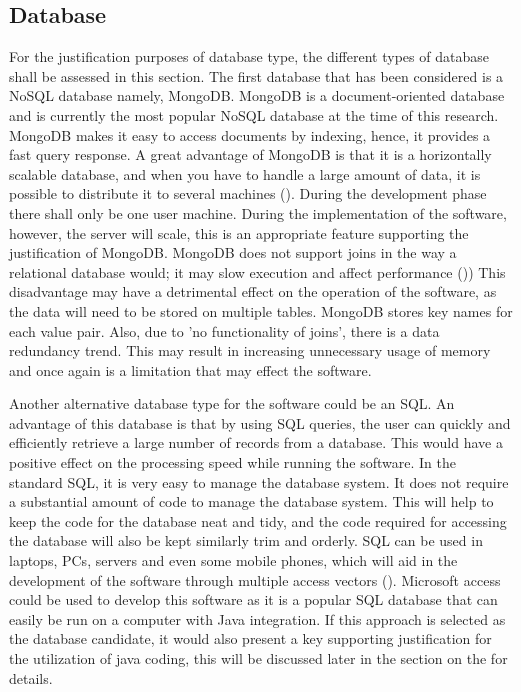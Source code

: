 \subsection*{Database}
For the justification purposes of database type, the different types of database shall be assessed in this section. The first database that has been considered is a NoSQL database namely, MongoDB. MongoDB is a document-oriented database and is currently the most popular NoSQL database at the time of this research.  MongoDB makes it easy to access documents by indexing, hence, it provides a fast query response. A great advantage of MongoDB is that it is a horizontally scalable database, and when you have to handle a large amount of data, it is possible to distribute it to several machines (\cite{MongoDB5}). During the development phase there shall only be one user machine. During the implementation of the software, however, the server will scale, this is an appropriate feature supporting the justification of MongoDB. MongoDB does not support joins in the way a relational database would; it may slow execution and affect performance (\cite{MongoDBComp})) This disadvantage may have a detrimental effect on the operation of the software, as the data will need to be stored on multiple tables. MongoDB stores key names for each value pair. Also, due to 'no functionality of joins', there is a data redundancy trend. This may result in increasing unnecessary usage of memory and once again is a limitation that may effect the software.

Another alternative database type for the software could be an SQL. An advantage of this database is that by using SQL queries, the user can quickly and efficiently retrieve a large number of records from a database. This would have a positive effect on the processing speed while running the software. In the standard SQL, it is very easy to manage the database system. It does not require a substantial amount of code to manage the database system. This will help to keep the code for the database neat and tidy, and the code required for accessing the database will also be kept similarly trim and orderly. SQL can be used in laptops, PCs, servers and even some mobile phones, which will aid in the development of the software through multiple access vectors (\cite{JavaTPoint}). Microsoft access could be used to develop this software as it is a popular SQL database that can easily be run on a computer with Java integration. If this approach is selected as the database candidate, it would also present a key supporting justification for the utilization of java coding, this will be discussed later in the section on the  for details.  


